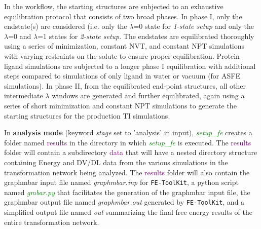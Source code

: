\documentclass[11pt,letterpaper,titlepage]{article}
\newcommand{\tk}{\texttt{FE-ToolKit}}
\begin{document}
\vspace{0.1cm}

In the workflow, the starting structures are subjected to an exhaustive equilibration protocol
that consists of two broad phases. In phase I, only the endstate(s) are considered (i.e. only the
$\lambda$=0 state for \textit{1-state setup} and only the $\lambda$=0 and $\lambda$=1 states for 
\textit{2-state setup}. The endstates are equilibrated thoroughly using a series of minimization, 
constant NVT, and constant NPT simulations with varying restraints on the solute to ensure proper
equilibration. Protein-ligand simulations are subjected to a longer phase I equilibration with 
additional steps compared to simulations of only ligand in water or vacuum (for ASFE simulations). 
In phase II, from the equilibrated end-point structures, all other intermediate 
$\lambda$ windows are generated and further equilibrated, again using a series of short minimization
and constant NPT simulations to generate the starting structures for the production TI simulations.

\vspace{0.1cm}

\vspace{0.2cm}
\noindent
\begin{center}
\setlength{\fboxrule}{2pt}
\setlength{\fboxsep}{10pt}
\end{center}
\vspace{0.2cm}



In \textbf{analysis mode} (keyword \textit{stage} set to 'analysis' in input), 
\textcolor{green}{\textit{setup\_fe}} creates a folder named 
\textcolor{purple}{results} in the directory in which \textcolor{green}{\textit{setup\_fe}} is executed. 
The \textcolor{purple}{results} folder will contain a subdirectory \textcolor{purple}{data} that will 
have a nested directory 
structure containing Energy and DV/DL data from the various simulations in the transformation network 
being analyzed. The \textcolor{purple}{results} folder will also contain the graphmbar input file named
\textit{graphmbar.inp} for \tk{}, a python script named \textcolor{green}{\textit{gmbar.py}} that facilitates 
the generation of the graphmbar input file, the graphmbar output file named \textit{graphmbar.out} 
generated by \tk{}, and a simplified output file named \textit{out} summarizing the final 
free energy results of the entire transformation network.
\end{document}
